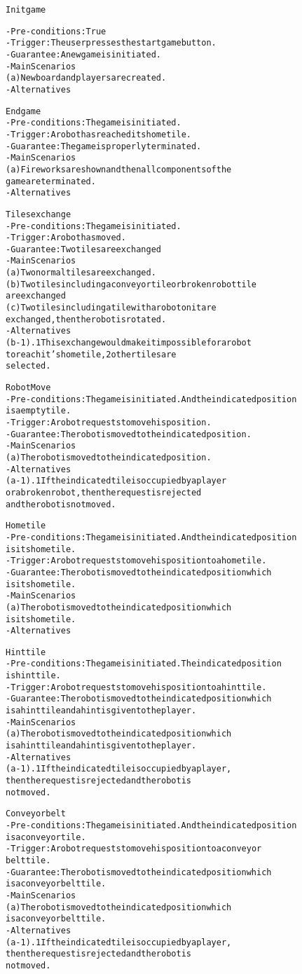\begin{alltt}
\rm
Init game

- Pre-conditions: True
- Trigger: The user presses the start game button.
- Guarantee: A new game is initiated.
- Main Scenarios
    (a) New board and players are created.
- Alternatives


End game
- Pre-conditions: The game is initiated.
- Trigger:  A robot has reached its home tile.
- Guarantee: The game is properly terminated.
- Main Scenarios
    (a) Fireworks are shown and then all components of the 
        game are terminated.
- Alternatives


Tiles exchange
- Pre-conditions: The game is initiated.
- Trigger:  A robot has moved.
- Guarantee: Two tiles are exchanged
- Main Scenarios
    (a) Two normal tiles are exchanged.
    (b) Two tiles including a conveyor tile or broken robot tile 
        are exchanged
    (c) Two tiles including a tile with a robot on it are 
        exchanged, then the robot is rotated.
- Alternatives
    (b-1).1 This exchange would make it impossible for a robot 
            to reach it's home tile, 2 other tiles are 
            selected.


Robot Move
- Pre-conditions: The game is initiated. And the indicated position 
    is a empty tile.
- Trigger: A robot requests to move his position.
- Guarantee: The robot is moved to the indicated position.
- Main Scenarios
    (a) The robot is moved to the indicated position.
- Alternatives
    (a-1).1 If the indicated tile is occupied by a player 
        or a broken robot, then the request is rejected 
        and the robot is not moved.


Home tile
- Pre-conditions: The game is initiated. And the indicated position 
    is its home tile.
- Trigger: A robot requests to move his position to a home tile.
- Guarantee: The robot is moved to the indicated position which 
    is its home tile.
- Main Scenarios
    (a) The robot is moved to the indicated position which 
        is its home tile.
- Alternatives

Hint tile
- Pre-conditions: The game is initiated. The indicated position 
    is hint tile.
- Trigger: A robot requests to move his position to a hint tile.
- Guarantee: The robot is moved to the indicated position which 
    is a hint tile and a hint is given to the player.
- Main Scenarios
    (a) The robot is moved to the indicated position which 
        is a hint tile and a hint is given to the player.
- Alternatives
    (a-1).1 If the indicated tile is occupied by a player, 
        then the request is rejected and the robot is 
        not moved.


Conveyor belt
- Pre-conditions: The game is initiated. And the indicated position 
    is a conveyor tile.
- Trigger: A robot requests to move his position to a conveyor 
    belt tile.
- Guarantee: The robot is moved to the indicated position which 
    is a conveyor belt tile.
- Main Scenarios
    (a) The robot is moved to the indicated position which 
        is a conveyor belt tile.
- Alternatives
    (a-1).1 If the indicated tile is occupied by a player, 
        then the request is rejected and the robot is 
        not moved.
\end{alltt}
